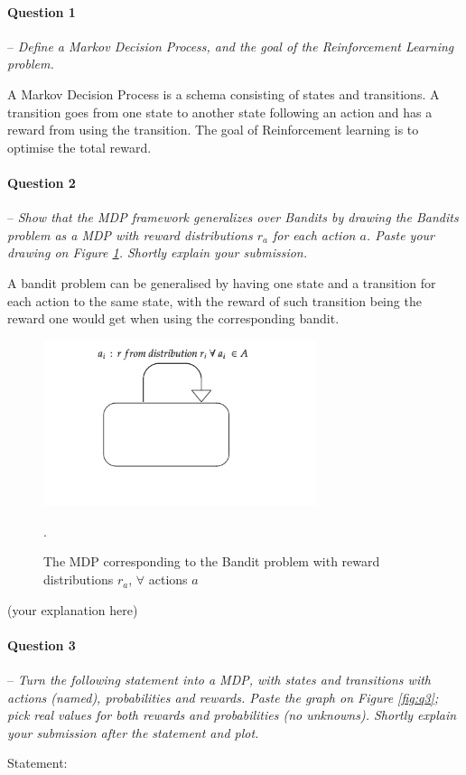 \documentclass[a4paper]{article}
\newcommand{\question}[2]{
\paragraph{Question #1} -- \textit{#2}

}
\begin{document}
\question{1}{Define a Markov Decision Process, and the goal of the Reinforcement Learning problem.}
A Markov Decision Process is a schema consisting of states and transitions. A transition goes from one state to another state following an action and has a reward from using the transition. The goal of Reinforcement learning is to optimise the total reward. 

\question{2}{Show that the MDP framework generalizes over Bandits by drawing the Bandits problem as a MDP with reward distributions $r_a$ for each action $a$. Paste your drawing on Figure \ref{fig:bandit_mdp}. Shortly explain your submission.}
A bandit problem can be generalised by having one state and a transition for each action to the same state, with the reward of such transition being the reward one would get when using the corresponding bandit.
\begin{figure}[H]
    \centering
    \includegraphics[width=8cm]{plots/Bandit_MDP.png}
    \caption{The MDP corresponding to the Bandit problem with reward distributions $r_a$, $\forall$ actions $a$}.
    \label{fig:bandit_mdp}
\end{figure}{}
(your explanation here)


\question{3}{Turn the following statement into a MDP, with states and transitions with actions (named), probabilities and rewards. Paste the graph on Figure \ref{fig:q3}; pick real values for both rewards and probabilities (no unknowns). Shortly explain your submission after the statement and plot.}

Statement:
\end{document}
